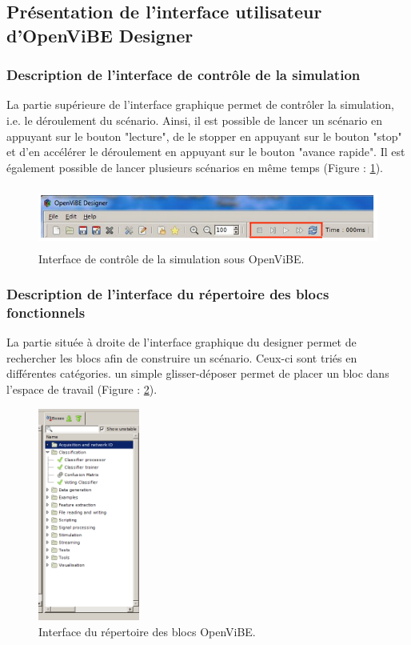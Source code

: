 \subsection*{Présentation de l'interface utilisateur d'OpenViBE Designer}

\subsubsection*{Description de l'interface de contrôle de la simulation}

La partie supérieure de l'interface graphique permet de contrôler la simulation, i.e. le déroulement du scénario. Ainsi, il est possible de lancer un scénario en appuyant sur le bouton "lecture", de le stopper en appuyant sur le bouton "stop" et d'en accélérer le déroulement en appuyant sur le bouton "avance rapide". Il est également possible de lancer plusieurs scénarios en même temps (Figure : \ref{fig:interface_simu_ov_2}). 

\begin{figure}[h]
	\centering\includegraphics[height=2cm]{images/interface_simu_ov.png}
	\caption{Interface de contrôle de la simulation sous OpenViBE.}
	\label{fig:interface_simu_ov_2}
\end{figure}

\subsubsection*{Description de l'interface du répertoire des blocs fonctionnels}

La partie située à droite de l'interface graphique du designer permet de rechercher les blocs afin de construire un scénario. Ceux-ci sont triés en différentes catégories. un simple glisser-déposer permet de placer un bloc dans l'espace de travail (Figure : \ref{fig:interface_bloc_ov_2}).

\begin{figure}[h]
	\centering\includegraphics[height=7cm]{images/interface_bloc_ov.png}
	\caption{Interface du répertoire des blocs OpenViBE.}
	\label{fig:interface_bloc_ov_2}
\end{figure}

